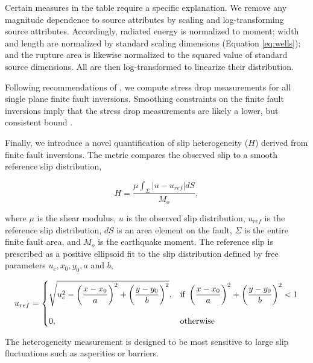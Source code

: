 \documentclass[draft]{agujournal2018}
\begin{document}
Certain measures in the table require a specific explanation. We remove any magnitude dependence to source attributes by scaling and log-transforming source attributes. Accordingly, radiated energy is normalized to moment; width and length are normalized by standard scaling dimensions (Equation \ref{eq:wells}); and the rupture area is likewise normalized to the squared value of standard source dimensions. All are then log-transformed to linearize their distribution. 

Following recommendations of \citet{Noda2013}, we compute stress drop measurements for all single plane finite fault inversions. Smoothing constraints on the finite fault inversions imply that the stress drop measurements are likely a lower, but consistent bound \citep{Adams2017ExploringInversions}. 

Finally, we introduce a novel quantification of slip heterogeneity ($H$) derived from finite fault inversions. The metric compares the observed slip to a smooth reference slip distribution,
%
\begin{linenomath*}
\begin{equation}
    H = \dfrac{\mu \int_\Sigma |u-u_{ref}| dS}{M_o},
\end{equation}
\end{linenomath*}
%
where $\mu$ is the shear modulus, $u$ is the observed slip distribution, $u_{ref}$ is the reference slip distribution, $dS$ is an area element on the fault, $\Sigma$ is the entire finite fault area, and $M_o$ is the earthquake moment. The reference slip is prescribed as a positive ellipsoid fit to the slip distribution defined by free parameters $u_{c}, x_0, y_0, a$ and $b$,
%
\begin{linenomath*}
\begin{equation}\label{eq:heterogeneity}
u_{ref}=\left\{
\begin{array}{@{}ll@{}}
     \sqrt{u_{c}^2 - \left(\dfrac{x-x_0}{a}\right)^2 +  \left(\dfrac{y-y_0}{b}\right)^2}, & \text{if}\ \left(\dfrac{x-x_0}{a}\right)^2 +  \left(\dfrac{y-y_0}{b}\right)^2 < 1 \\
     \\
    0, & \text{otherwise}
    \end{array}\right.
\end{equation}
\end{linenomath*}

The heterogeneity measurement is designed to be most sensitive to large slip fluctuations such as asperities or barriers.
\end{document}
